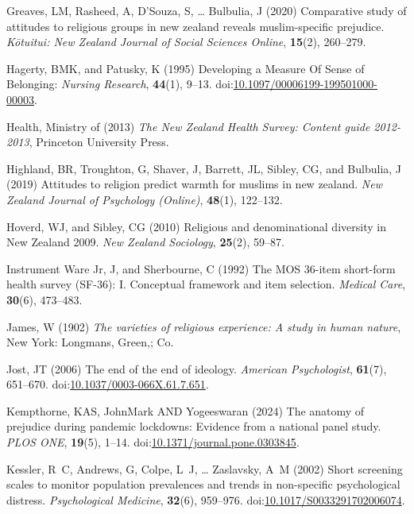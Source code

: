 \documentclass[
  single column]{article}
\newlength{\cslhangindent}
\newenvironment{CSLReferences}[2] %
 {\begin{list}{}{%
  \setlength{\itemindent}{0pt}
  \setlength{\leftmargin}{0pt}
  \setlength{\parsep}{0pt}
  \ifodd #1
   \setlength{\leftmargin}{\cslhangindent}
   \setlength{\itemindent}{-1\cslhangindent}
  \fi
  \setlength{\itemsep}{#2\baselineskip}}}
 {\end{list}}
\begin{document}
\begin{CSLReferences}{1}{0}
Greaves, LM, Rasheed, A, D'Souza, S, \ldots{} Bulbulia, J (2020)
Comparative study of attitudes to religious groups in new zealand
reveals muslim-specific prejudice. \emph{K{ō}tuitui: New Zealand Journal
of Social Sciences Online}, \textbf{15}(2), 260--279.

Hagerty, BMK, and Patusky, K (1995) Developing a Measure Of Sense of
Belonging: \emph{Nursing Research}, \textbf{44}(1), 9--13.
doi:\href{https://doi.org/10.1097/00006199-199501000-00003}{10.1097/00006199-199501000-00003}.

Health, Ministry of (2013) \emph{The {N}ew {Z}ealand {H}ealth {S}urvey:
Content guide 2012-2013}, Princeton University Press.

Highland, BR, Troughton, G, Shaver, J, Barrett, JL, Sibley, CG, and
Bulbulia, J (2019) Attitudes to religion predict warmth for muslims in
new zealand. \emph{New Zealand Journal of Psychology (Online)},
\textbf{48}(1), 122--132.

Hoverd, WJ, and Sibley, CG (2010) Religious and denominational diversity
in {N}ew {Z}ealand 2009. \emph{New Zealand Sociology}, \textbf{25}(2),
59--87.

Instrument Ware Jr, J, and Sherbourne, C (1992) The MOS 36-item
short-form health survey (SF-36): I. Conceptual framework and item
selection. \emph{Medical Care}, \textbf{30}(6), 473--483.

James, W (1902) \emph{The varieties of religious experience: A study in
human nature}, New York: Longmans, Green,; Co.

Jost, JT (2006) The end of the end of ideology. \emph{American
Psychologist}, \textbf{61}(7), 651--670.
doi:\href{https://doi.org/10.1037/0003-066X.61.7.651}{10.1037/0003-066X.61.7.651}.

Kempthorne, KAS, JohnMark AND Yogeeswaran (2024) The anatomy of
prejudice during pandemic lockdowns: Evidence from a national panel
study. \emph{PLOS ONE}, \textbf{19}(5), 1--14.
doi:\href{https://doi.org/10.1371/journal.pone.0303845}{10.1371/journal.pone.0303845}.

Kessler, R~C, Andrews, G, Colpe, L~J, \ldots{} Zaslavsky, A~M (2002)
Short screening scales to monitor population prevalences and trends in
non-specific psychological distress. \emph{Psychological Medicine},
\textbf{32}(6), 959--976.
doi:\href{https://doi.org/10.1017/S0033291702006074}{10.1017/S0033291702006074}.


\end{CSLReferences}
\end{document}
